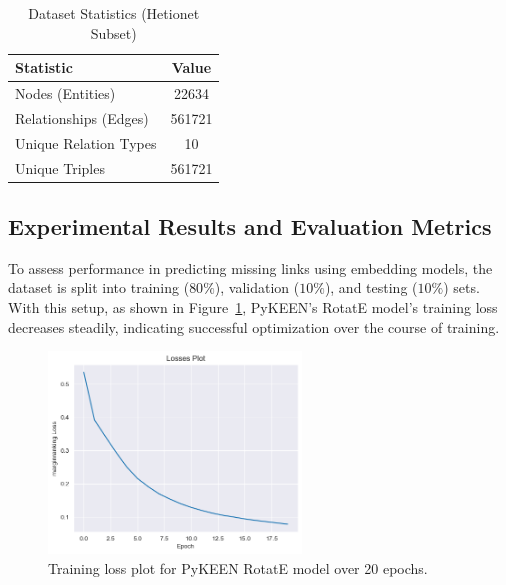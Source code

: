 \begin{table}[ht]
    \centering
    \caption{Dataset Statistics (Hetionet Subset)}
    \begin{tabular}{l c}
        \hline
        \textbf{Statistic}    & \textbf{Value} \\
        \hline
        Nodes (Entities)      & 22634          \\ %
        Relationships (Edges) & 561721         \\ %
        Unique Relation Types & 10             \\ %
        Unique Triples        & 561721         \\ %
        \hline
    \end{tabular}
    \label{tab:dataset_stats}
\end{table}

\subsection*{Experimental Results and Evaluation Metrics}

To assess performance in predicting missing links using embedding models, the dataset is split into training ($80\%$), validation ($10\%$), and testing ($10\%$) sets. With this setup, as shown in Figure~\ref{fig:loss_plot}, PyKEEN's RotatE model's training loss decreases steadily, indicating successful optimization over the course of training.

\begin{figure}[ht]
    \centering
    \includegraphics[width=0.6\textwidth]{images/pykeen/losses.png}
    \caption{Training loss plot for PyKEEN RotatE model over 20 epochs.}
    \label{fig:loss_plot}
\end{figure}


